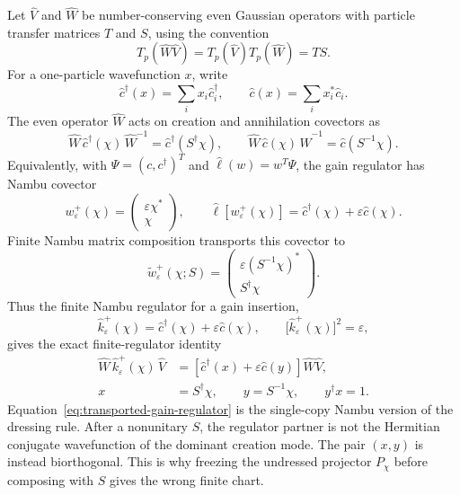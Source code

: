 \documentclass[aps,prb,onecolumn,nofootinbib,superscriptaddress]{revtex4-2}
\theoremstyle{plain}
\theoremstyle{definition}
\begin{document}
Let \(\hat V\) and \(\hat W\) be number-conserving even Gaussian operators
with particle transfer matrices \(T\) and \(S\), using the convention
\[
  T_p(\hat W\hat V)=T_p(\hat V)T_p(\hat W)=TS .
\]
For a one-particle wavefunction \(x\), write
\begin{equation}
  \hat c^\dagger(x)=\sum_i x_i\hat c_i^\dagger,
  \qquad
  \hat c(x)=\sum_i x_i^*\hat c_i .
  \label{eq:mode-linear-forms-for-dressed-projector}
\end{equation}
The even operator \(\hat W\) acts on creation and annihilation covectors as
\begin{equation}
  \hat W\,\hat c^\dagger(\chi)\,\hat W^{-1}
  =
  \hat c^\dagger(S^\dagger\chi),
  \qquad
  \hat W\,\hat c(\chi)\,\hat W^{-1}
  =
  \hat c(S^{-1}\chi).
  \label{eq:even-dresses-nambu-linear-forms}
\end{equation}
Equivalently, with \(\Psi=(c,c^\dagger)^T\) and
\(\hat\ell(w)=w^T\Psi\), the gain regulator has Nambu covector
\begin{equation}
  w_\varepsilon^+(\chi)
  =
  \begin{pmatrix}
    \varepsilon\chi^*\\
    \chi
  \end{pmatrix},
  \qquad
  \hat\ell[w_\varepsilon^+(\chi)]
  =
  \hat c^\dagger(\chi)+\varepsilon\hat c(\chi).
  \label{eq:nambu-covector-gain-regulator}
\end{equation}
Finite Nambu matrix composition transports this covector to
\begin{equation}
  \widetilde w_\varepsilon^+(\chi;S)
  =
  \begin{pmatrix}
    \varepsilon(S^{-1}\chi)^*\\
    S^\dagger\chi
  \end{pmatrix}.
  \label{eq:nambu-transported-gain-covector}
\end{equation}
Thus the finite Nambu regulator for a gain insertion,
\begin{equation}
  \hat k_\varepsilon^+(\chi)
  =
  \hat c^\dagger(\chi)+\varepsilon\hat c(\chi),
  \qquad
  \bigl[\hat k_\varepsilon^+(\chi)\bigr]^2=\varepsilon,
  \label{eq:single-copy-gain-regulator}
\end{equation}
gives the exact finite-regulator identity
\begin{align}
  \hat W\,\hat k_\varepsilon^+(\chi)\,\hat V
  &=
  \left[
    \hat c^\dagger(x)+\varepsilon\hat c(y)
  \right]\hat W\hat V,
  \label{eq:transported-gain-regulator}\\
  x&=S^\dagger\chi,
  \qquad
  y=S^{-1}\chi,
  \qquad
  y^\dagger x=1 .
  \label{eq:biorthogonal-dressed-gain-pair}
\end{align}
Equation~\eqref{eq:transported-gain-regulator} is the single-copy Nambu
version of the dressing rule.  After a nonunitary \(S\), the regulator partner
is not the Hermitian conjugate wavefunction of the dominant creation mode.
The pair \((x,y)\) is instead biorthogonal.  This is why freezing the
undressed projector \(P_\chi\) before composing with \(S\) gives the wrong
finite chart.
\end{document}
